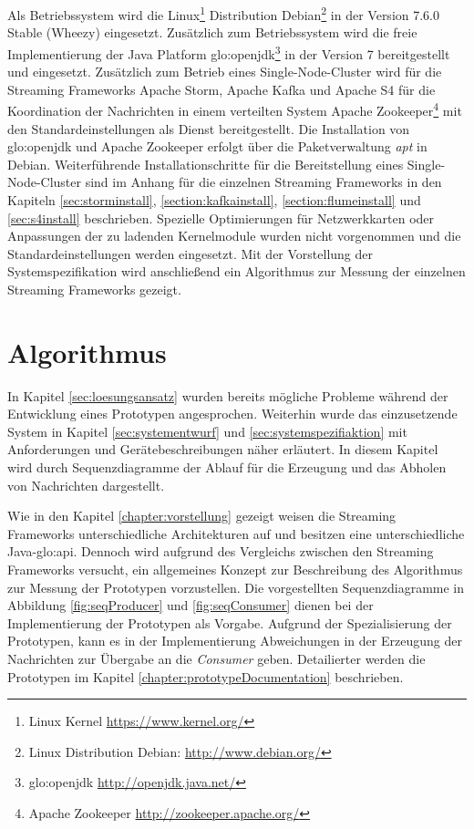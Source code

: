 Als Betriebssystem wird die Linux\footnote{Linux Kernel \url{https://www.kernel.org/}} Distribution Debian\footnote{Linux Distribution Debian: \url{http://www.debian.org/}} in der Version 7.6.0 Stable (Wheezy) eingesetzt. Zusätzlich zum Betriebssystem wird die freie Implementierung der Java Platform \gls{glo:openjdk}\footnote{\gls{glo:openjdk} \url{http://openjdk.java.net/}} in der Version 7 bereitgestellt und eingesetzt. Zusätzlich zum Betrieb eines Single-Node-Cluster wird für die Streaming Frameworks Apache Storm, Apache Kafka und Apache S4 für die Koordination der Nachrichten in einem verteilten System Apache Zookeeper\footnote{Apache Zookeeper \url{http://zookeeper.apache.org/}} mit den Standardeinstellungen als Dienst bereitgestellt. Die Installation von \gls{glo:openjdk} und Apache Zookeeper erfolgt über die Paketverwaltung \textit{apt} in Debian. Weiterführende Installationschritte für die Bereitstellung eines Single-Node-Cluster sind im Anhang für die einzelnen Streaming Frameworks in den Kapiteln \ref{sec:storminstall}, \ref{section:kafkainstall}, \ref{section:flumeinstall} und \ref{sec:s4install} beschrieben. Spezielle Optimierungen für Netzwerkkarten oder Anpassungen der zu ladenden Kernelmodule wurden nicht vorgenommen und die Standardeinstellungen werden eingesetzt. Mit der Vorstellung der Systemspezifikation wird anschließend ein Algorithmus zur Messung der einzelnen Streaming Frameworks gezeigt.


\section{Algorithmus}
\label{sec:algorithmus}

In Kapitel \ref{sec:loesungsansatz} wurden bereits mögliche Probleme während der Entwicklung eines Prototypen angesprochen. Weiterhin wurde das einzusetzende System in Kapitel \ref{sec:systementwurf} und \ref{sec:systemspezifiaktion} mit Anforderungen und Gerätebeschreibungen näher erläutert. In diesem Kapitel wird durch Sequenzdiagramme der Ablauf für die Erzeugung und das Abholen von Nachrichten dargestellt.

Wie in den Kapitel \ref{chapter:vorstellung} gezeigt weisen die Streaming Frameworks unterschiedliche Architekturen auf und besitzen eine unterschiedliche Java-\gls{glo:api}. Dennoch wird aufgrund des Vergleichs zwischen den Streaming Frameworks versucht, ein allgemeines Konzept zur Beschreibung des Algorithmus zur Messung der Prototypen vorzustellen. Die vorgestellten Sequenzdiagramme in Abbildung \ref{fig:seqProducer} und \ref{fig:seqConsumer} dienen bei der Implementierung der Prototypen als Vorgabe. Aufgrund der Spezialisierung der Prototypen, kann es in der Implementierung Abweichungen in der Erzeugung der Nachrichten zur Übergabe an die \textit{Consumer} geben. Detailierter werden die Prototypen im Kapitel \ref{chapter:prototypeDocumentation} beschrieben.

